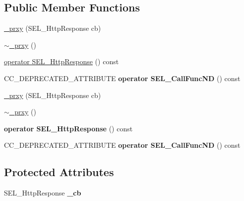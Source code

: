 \subsection*{Public Member Functions}
\begin{DoxyCompactItemize}
\item 
\hyperlink{classnetwork_1_1HttpRequest_1_1__prxy_a01020d64085bbc59cf1218bed510355a}{\+\_\+prxy} (S\+E\+L\+\_\+\+Http\+Response cb)
\item 
\hyperlink{classnetwork_1_1HttpRequest_1_1__prxy_aac8954b9e734cc5778de83fa2a452b47}{$\sim$\+\_\+prxy} ()
\item 
\hyperlink{classnetwork_1_1HttpRequest_1_1__prxy_a77cd2d1b059a4ddc7332f5adbe87cddc}{operator S\+E\+L\+\_\+\+Http\+Response} () const
\item 
\mbox{\label{classnetwork_1_1HttpRequest_1_1__prxy_a831ad26464579ae87f72d6113c5a8a6d}} 
C\+C\+\_\+\+D\+E\+P\+R\+E\+C\+A\+T\+E\+D\+\_\+\+A\+T\+T\+R\+I\+B\+U\+TE {\bfseries operator S\+E\+L\+\_\+\+Call\+Func\+ND} () const
\item 
\hyperlink{classnetwork_1_1HttpRequest_1_1__prxy_a01020d64085bbc59cf1218bed510355a}{\+\_\+prxy} (S\+E\+L\+\_\+\+Http\+Response cb)
\item 
\hyperlink{classnetwork_1_1HttpRequest_1_1__prxy_aac8954b9e734cc5778de83fa2a452b47}{$\sim$\+\_\+prxy} ()
\item 
\mbox{\label{classnetwork_1_1HttpRequest_1_1__prxy_a77cd2d1b059a4ddc7332f5adbe87cddc}} 
{\bfseries operator S\+E\+L\+\_\+\+Http\+Response} () const
\item 
\mbox{\label{classnetwork_1_1HttpRequest_1_1__prxy_a831ad26464579ae87f72d6113c5a8a6d}} 
C\+C\+\_\+\+D\+E\+P\+R\+E\+C\+A\+T\+E\+D\+\_\+\+A\+T\+T\+R\+I\+B\+U\+TE {\bfseries operator S\+E\+L\+\_\+\+Call\+Func\+ND} () const
\end{DoxyCompactItemize}
\subsection*{Protected Attributes}
\begin{DoxyCompactItemize}
\item 
\mbox{\label{classnetwork_1_1HttpRequest_1_1__prxy_a7493ede18daf7685997e15fb5451e379}} 
S\+E\+L\+\_\+\+Http\+Response {\bfseries \+\_\+cb}
\end{DoxyCompactItemize}


